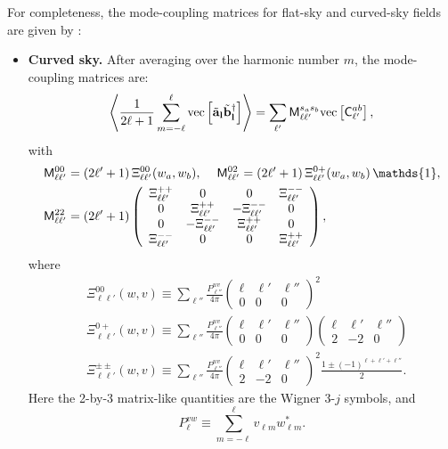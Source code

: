 \documentclass[a4paper,11pt]{article}
\newcommand{\wtj}[6]{\left(\begin{array}{ccc} #1 & #2 & #3\\#4 & #5 & #6\end{array} \right)}
\begin{document}
      For completeness, the mode-coupling matrices for flat-sky and curved-sky fields are given by \cite{2019MNRAS.484.4127A}:
      \begin{itemize}
        \item {\bf Curved sky.} After averaging over the harmonic number $m$, the mode-coupling matrices are:
        \begin{equation}\label{eq:mcms}
          \left\langle\frac{1}{2\ell+1}\sum_{m=-\ell}^\ell {\rm vec}\left[\tilde{\bf a}_{\bf l}\tilde{\bf b}^\dag_{\bf l}\right]\right\rangle=\sum_{\ell'}{\sf M}^{s_as_b}_{\ell\ell'} {\rm vec}\left[{\sf C}^{ab}_{\ell'}\right],
        \end{equation}
        with
        \begin{align}
          &{\sf M}^{00}_{\ell\ell'}=(2\ell'+1)\,\Xi^{00}_{\ell\ell'}(w_a,w_b),\hspace{12pt}
          {\sf M}^{02}_{\ell\ell'}=(2\ell'+1)\,\Xi^{0+}_{\ell\ell'}(w_a,w_b)\,\mathds{1},\\
          &{\sf M}^{22}_{\ell\ell'}=(2\ell'+1)
          \left(
          \begin{array}{cccc}
            \Xi^{++}_{\ell\ell'} & 0 & 0 & \Xi^{--}_{\ell\ell'} \\
            0 & \Xi^{++}_{\ell\ell'} & -\Xi^{--}_{\ell\ell'} & 0 \\
            0 & -\Xi^{--}_{\ell\ell'} & \Xi^{++}_{\ell\ell'} & 0 \\
            \Xi^{--}_{\ell\ell'} & 0 & 0 & \Xi^{++}_{\ell\ell'}
          \end{array}\right),
        \end{align}
        where
        \begin{align}\label{eq:coeff_mcm}
          &\Xi^{00}_{\ell\ell'}(w,v)  \equiv\sum_{\ell''}\frac{P^{wv}_{\ell''}}{4\pi}\wtj{\ell}{\ell'}{\ell''}{0}{0}{0}^2\\
          &\Xi^{0+}_{\ell\ell'}(w,v)  \equiv\sum_{\ell''}\frac{P^{wv}_{\ell''}}{4\pi}\wtj{\ell}{\ell'}{\ell''}{0}{0}{0}\wtj{\ell}{\ell'}{\ell''}{2}{-2}{0}\\
          &\Xi^{\pm\pm}_{\ell\ell'}(w,v) \equiv\sum_{\ell''}\frac{P^{wv}_{\ell''}}{4\pi}\wtj{\ell}{\ell'}{\ell''}{2}{-2}{0}^2\frac{1\pm(-1)^{\ell+\ell'+\ell''}}{2}.
        \end{align}
        Here the 2-by-3 matrix-like quantities are the Wigner 3-$j$ symbols, and
        \begin{equation}
          P^{vw}_\ell\equiv\sum_{m=-\ell}^\ell v_{\ell m}w^*_{\ell m}.
        \end{equation}

\end{itemize}
\end{document}
